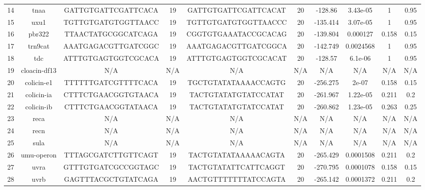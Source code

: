 \documentclass{article}
\begin{document}
\begin{table}
{\begin{tabular}{c|c|c|c|c|c|c|c|c|c}
 14 &          tnaa &  GATTGTGATTCGATTCACA &    19 &  GATTGTGATTCGATTCACAT &         20 &   -128.86 &   3.43e-05 &        1 &   0.95 \\
 15 &          uxu1 &  TGTTGTGATGTGGTTAACC &    19 &  TGTTGTGATGTGGTTAACCC &         20 &  -135.414 &   3.07e-05 &        1 &   0.95 \\
 16 &        pbr322 &  TTAACTATGCGGCATCAGA &    19 &  CGGTGTGAAATACCGCACAG &         20 &  -139.804 &   0.000127 &    0.158 &   0.15 \\
 17 &       trn9cat &  AAATGAGACGTTGATCGGC &    19 &  AAATGAGACGTTGATCGGCA &         20 &  -142.749 &  0.0024568 &        1 &   0.95 \\
 18 &           tdc &  ATTTGTGAGTGGTCGCACA &    19 &  ATTTGTGAGTGGTCGCACAT &         20 &   -128.57 &    6.1e-06 &        1 &   0.95 \\
 19 &  cloacin-df13 &                  N/A &   N/A &                   N/A &        N/A &       N/A &        N/A &      N/A &    N/A \\
 20 &    colicin-e1 &  TTTTTTGATCGTTTTCACA &    19 &  TGCTGTATATAAAACCAGTG &         20 &  -256.275 &      2e-07 &    0.158 &   0.15 \\
 21 &    colicin-ia &  CTTTCTGAACGGTGTAACA &    19 &  TACTGTATATGTATCCATAT &         20 &  -261.967 &   1.22e-05 &    0.211 &    0.2 \\
 22 &    colicin-ib &  CTTTCTGAACGGTATAACA &    19 &  TACTGTATATGTATCCATAT &         20 &  -260.862 &   1.23e-05 &    0.263 &   0.25 \\
 23 &          reca &                  N/A &   N/A &                   N/A &        N/A &       N/A &        N/A &      N/A &    N/A \\
 24 &          recn &                  N/A &   N/A &                   N/A &        N/A &       N/A &        N/A &      N/A &    N/A \\
 25 &          sula &                  N/A &   N/A &                   N/A &        N/A &       N/A &        N/A &      N/A &    N/A \\
 26 &    umu-operon &  TTTAGCGATCTTGTTCAGT &    19 &  TACTGTATATAAAAACAGTA &         20 &  -265.429 &  0.0001508 &    0.211 &    0.2 \\
 27 &          uvra &  GTTTGTGATCGCCGGTAGC &    19 &  TACTGTATATTCATTCAGGT &         20 &  -270.795 &  0.0001078 &    0.158 &   0.15 \\
 28 &          uvrb &  GAGTTTACGCTGTATCAGA &    19 &  AACTGTTTTTTTATCCAGTA &         20 &  -265.142 &  0.0001372 &    0.211 &    0.2 \\

\end{tabular}}
\end{table}
\end{document}
